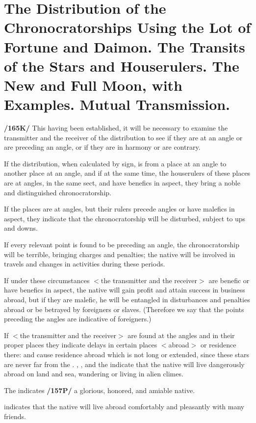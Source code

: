 \section{The Distribution of the Chronocratorships Using the Lot of Fortune and Daimon. The Transits of the Stars and Houserulers. The New and Full Moon, with Examples. Mutual Transmission.}

\textbf{/165K/} This having been established, it will be necessary to examine the transmitter and the receiver of the
distribution to see if they are at an angle or are preceding an angle, or if they are in harmony or are contrary.

If the distribution, when calculated by sign, is from a place at an angle to another place at an angle, and if at the same time, the houserulers of these places are at angles, in the same sect, and have benefics in aspect, they bring a noble and distinguished chronocratorship. 

If the places are at angles, but their rulers precede angles or have malefics in aspect, they indicate that the chronocratorship will be disturbed, subject to ups and downs.

If every relevant point is found to be preceding an angle, the chronocratorship will be terrible, bringing charges and penalties; the native will be involved in travels and changes in activities during these periods.

If under these circumstances $<$the transmitter and the receiver$>$ are benefic or have benefics in aspect, the native will gain profit and attain success in business abroad, but if they are malefic, he will be entangled in disturbances and penalties abroad or be betrayed by foreigners or slaves. (Therefore we say that the points preceding the angles are indicative of foreigners.) 

If $<$the transmitter and the receiver$>$ are found at the angles and in their proper places they indicate delays in certain places $<$abroad$>$ or residence there: \Mercury\xspace and \Venus\xspace cause residence abroad which is not long or extended, since these stars are never far from the \Sun. \Saturn, \Mars, and the \Moon\xspace indicate that the native will live dangerously abroad on land and sea, wandering or living in alien climes. 

The \Sun\xspace indicates \textbf{/157P/} a glorious, honored, and amiable native. 

\Jupiter\xspace indicates that the native will live abroad comfortably and pleasantly with many friends.

